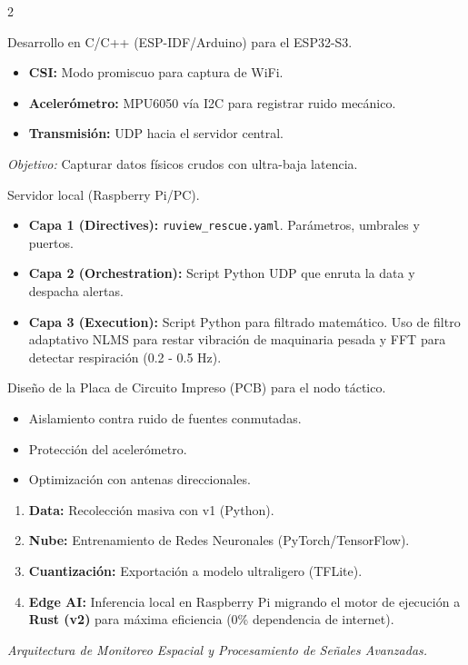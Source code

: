 \documentclass[a4paper,10pt]{article}
\begin{document}
\vspace{0.5cm}
\begin{multicols}{2}

\begin{tcolorbox}[infobox, title=Fase 1: Nodo ESP32 (Hardware)]
Desarrollo en C/C++ (ESP-IDF/Arduino) para el ESP32-S3.
\begin{itemize}
    \item \textbf{CSI:} Modo promiscuo para captura de WiFi.
    \item \textbf{Acelerómetro:} MPU6050 vía I2C para registrar ruido mecánico.
    \item \textbf{Transmisión:} UDP hacia el servidor central.
\end{itemize}
\textit{Objetivo:} Capturar datos físicos crudos con ultra-baja latencia.
\end{tcolorbox}

\begin{tcolorbox}[infobox, title=Fase 2: Motor Central (3 Capas)]
Servidor local (Raspberry Pi/PC).
\begin{itemize}
    \item \textbf{Capa 1 (Directives):} \texttt{ruview\_rescue.yaml}. Parámetros, umbrales y puertos.
    \item \textbf{Capa 2 (Orchestration):} Script Python UDP que enruta la data y despacha alertas.
    \item \textbf{Capa 3 (Execution):} Script Python para filtrado matemático. Uso de filtro adaptativo NLMS para restar vibración de maquinaria pesada y FFT para detectar respiración (0.2 - 0.5 Hz).
\end{itemize}
\end{tcolorbox}

\begin{tcolorbox}[infobox, title=Fase 3: Diseño KiCAD]
Diseño de la Placa de Circuito Impreso (PCB) para el nodo táctico.
\begin{itemize}
    \item Aislamiento contra ruido de fuentes conmutadas.
    \item Protección del acelerómetro.
    \item Optimización con antenas direccionales.
\end{itemize}
\end{tcolorbox}

\begin{tcolorbox}[infobox, title=Fase 4: Inteligencia Artificial]
\begin{enumerate}
    \item \textbf{Data:} Recolección masiva con v1 (Python).
    \item \textbf{Nube:} Entrenamiento de Redes Neuronales (PyTorch/TensorFlow).
    \item \textbf{Cuantización:} Exportación a modelo ultraligero (TFLite).
    \item \textbf{Edge AI:} Inferencia local en Raspberry Pi migrando el motor de ejecución a \textbf{Rust (v2)} para máxima eficiencia (0\% dependencia de internet).
\end{enumerate}
\end{tcolorbox}

\end{multicols}

\vspace{1cm}
\begin{center}
    \textit{Arquitectura de Monitoreo Espacial y Procesamiento de Señales Avanzadas.}
\end{center}
\end{document}
